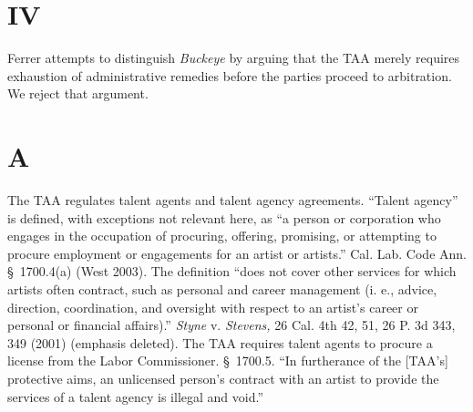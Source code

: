 \section{IV}

  Ferrer attempts to distinguish \emph{Buckeye} by arguing that the TAA
merely requires exhaustion of administrative remedies before the parties
proceed to arbitration. We reject that argument.

\section{A}

  The TAA regulates talent agents and talent agency agreements.
``Talent agency'' is defined, with exceptions not relevant here, as
``a person or corporation who engages in the occupation of procuring,
offering, promising, or attempting to procure employment or engagements
for an artist or artists.'' Cal. Lab. Code Ann. \S~1700.4(a) (West
2003). The definition \newpage  ``does not cover other services for
which artists often contract, such as personal and career management
(i. e., advice, direction, coordination, and oversight with respect to
an artist's career or personal or financial affairs).'' \emph{Styne}
v. \emph{Stevens,} 26 Cal. 4th 42, 51, 26 P. 3d 343, 349 (2001) (emphasis
deleted). The TAA requires talent agents to procure a license from
the Labor Commissioner. \S~1700.5. ``In furtherance of the [TAA's]
protective aims, an unlicensed person's contract with an artist
to provide the services of a talent agency is illegal and void.''
